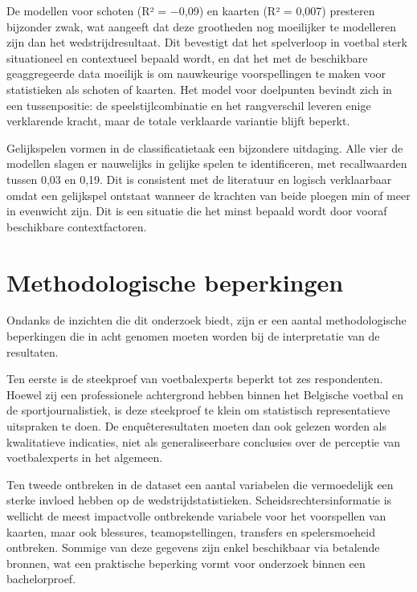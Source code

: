 \vspace{5pt}

De modellen voor schoten (R² = $-$0,09) en kaarten (R² = 0,007) presteren bijzonder zwak,
wat aangeeft dat deze grootheden nog moeilijker te modelleren zijn dan het wedstrijdresultaat.
Dit bevestigt dat het spelverloop in voetbal sterk situationeel en contextueel bepaald wordt,
en dat het met de beschikbare geaggregeerde data moeilijk is om nauwkeurige voorspellingen te maken voor statistieken als schoten of kaarten.
Het model voor doelpunten bevindt zich in een tussenpositie: de speelstijlcombinatie en het rangverschil leveren enige verklarende kracht,
maar de totale verklaarde variantie blijft beperkt.

\vspace{5pt}

Gelijkspelen vormen in de classificatietaak een bijzondere uitdaging. Alle vier de modellen slagen er nauwelijks in
gelijke spelen te identificeren, met recallwaarden tussen 0,03 en 0,19.
Dit is consistent met de literatuur en logisch verklaarbaar omdat een gelijkspel ontstaat wanneer
de krachten van beide ploegen min of meer in evenwicht zijn. Dit is een situatie die het minst bepaald wordt
door vooraf beschikbare contextfactoren.

\section{Methodologische beperkingen}

Ondanks de inzichten die dit onderzoek biedt, zijn er een aantal methodologische beperkingen die in acht genomen moeten worden bij de interpretatie van de resultaten.

\vspace{5pt}

Ten eerste is de steekproef van voetbalexperts beperkt tot zes respondenten.
Hoewel zij een professionele achtergrond hebben binnen het Belgische voetbal en de sportjournalistiek,
is deze steekproef te klein om statistisch representatieve uitspraken te doen.
De enquêteresultaten moeten dan ook gelezen worden als kwalitatieve indicaties, niet als generaliseerbare conclusies
over de perceptie van voetbalexperts in het algemeen.

\vspace{5pt}

Ten tweede ontbreken in de dataset een aantal variabelen die vermoedelijk een sterke invloed hebben
op de wedstrijdstatistieken. Scheidsrechtersinformatie is wellicht de meest impactvolle ontbrekende variabele voor het voorspellen van kaarten, maar ook blessures, teamopstellingen,
transfers en spelersmoeheid ontbreken.
Sommige van deze gegevens zijn enkel beschikbaar via betalende bronnen, wat een praktische beperking vormt
voor onderzoek binnen een bachelorproef.

